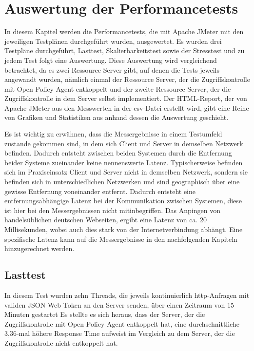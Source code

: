 \chapter{Auswertung der Performancetests}
In diesem Kapitel werden die Performancetests, die mit Apache JMeter mit den jeweiligen Testplänen durchgeführt wurden, ausgewertet. Es wurden drei Testpläne durchgeführt, Lasttest, Skalierbarkeitstest sowie der Stresstest und zu jedem Test folgt eine Auswertung. Diese Auswertung wird vergleichend betrachtet, da es zwei Ressource Server gibt, auf denen die Tests jeweils angewandt wurden, nämlich einmal der Ressource Server, der die Zugriffskontrolle mit Open Policy Agent entkoppelt und der zweite Ressource Server, der die Zugriffskontrolle in dem Server selbst implementiert. Der HTML-Report, der von Apache JMeter aus den Messwerten in der csv-Datei erstellt wird, gibt eine Reihe von Grafiken und Statistiken aus anhand dessen die Auswertung geschieht.\smallskip

Es ist wichtig zu erwähnen, dass die Messergebnisse in einem Testumfeld zustande gekommen sind, in dem sich Client und Server in demselben Netzwerk befinden. Dadurch entsteht zwischen beiden Systemen durch die Entfernung beider Systeme zueinander keine nennenswerte Latenz. Typischerweise befinden sich im Praxiseinsatz Client und Server nicht in demselben Netzwerk, sondern sie befinden sich in unterschiedlichen Netzwerken und sind geographisch über eine gewisse Entfernung voneinander entfernt. Dadurch entsteht eine entfernungsabhängige Latenz bei der Kommunikation zwischen Systemen, diese ist hier bei den Messergebnissen nicht mitinbegriffen. Das Anpingen von handelsüblichen deutschen Webseiten, ergibt eine Latenz von ca. 20 Millisekunden, wobei auch dies stark von der Internetverbindung abhängt. Eine spezifische Latenz kann auf die Messergebnisse in den nachfolgenden Kapiteln hinzugerechnet werden.

\section{Lasttest}
In diesem Test wurden zehn Threads, die jeweils kontinuierlich http-Anfragen mit validen JSON Web Token an den Server senden, über einen Zeitraum von 15 Minuten gestartet Es stellte es sich heraus, dass der Server, der die Zugriffskontrolle mit Open Policy Agent entkoppelt hat, eine durchschnittliche 3,36-mal höhere Response Time aufweist im Vergleich zu dem Server, der die Zugriffskontrolle nicht entkoppelt hat.\smallskip

